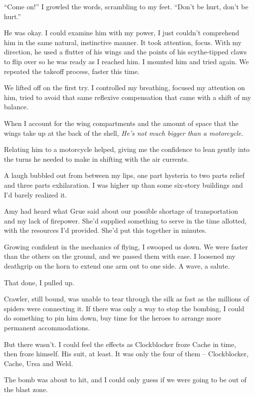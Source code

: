 ``Come on!''  I growled the words, scrambling to my feet.  ``Don't be hurt, don't be hurt.''



He was okay.  I could examine him with my power, I just couldn't comprehend him in the same natural, instinctive manner.  It took attention, focus.  With my direction, he used a flutter of his wings and the points of his scythe-tipped claws to flip over so he was ready as I reached him.  I mounted him and tried again.  We repeated the takeoff process, faster this time.



We lifted off on the first try.  I controlled my breathing, focused my attention on him, tried to avoid that same reflexive compensation that came with a shift of my balance.



When I account for the wing compartments and the amount of space that the wings take up at the back of the shell, \emph{He's not much bigger than a motorcycle.}



Relating him to a motorcycle helped, giving me the confidence to lean gently into the turns he needed to make in shifting with the air currents.



A laugh bubbled out from between my lips, one part hysteria to two parts relief and three parts exhilaration.  I was higher up than some six-story buildings and I'd barely realized it.



Amy had heard what Grue said about our possible shortage of transportation and my lack of firepower.  She'd supplied something to serve in the time allotted, with the resources I'd provided.  She'd put this together in minutes.



Growing confident in the mechanics of flying, I swooped us down.  We were faster than the others on the ground, and we passed them with ease.  I loosened my deathgrip on the horn to extend one arm out to one side.  A wave, a salute.



That done, I pulled up.



Crawler, still bound, was unable to tear through the silk as fast as the millions of spiders were connecting it.  If there was only a way to stop the bombing, I could do something to pin him down, buy time for the heroes to arrange more permanent accommodations.



But there wasn't.  I could feel the effects as Clockblocker froze Cache in time, then froze himself.  His suit, at least.  It was only the four of them – Clockblocker, Cache, Ursa and Weld.



The bomb was about to hit, and I could only guess if we were going to be out of the blast zone.





